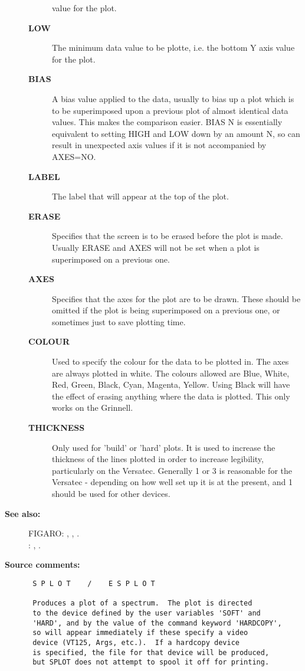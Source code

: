 \begin{description}
\begin{description}
 value for the plot.
\item [{\bf LOW}]
 The minimum data value to be plotte, i.e. the bottom Y axis
 value for the plot.
\item [{\bf BIAS}]
 A bias value applied to the data, usually to bias up a plot
 which is to be superimposed upon a previous plot of almost
 identical data values.  This makes the comparison easier.
 BIAS N  is essentially equivalent to setting HIGH and LOW
 down by an amount N, so can result in unexpected axis values
 if it is not accompanied by AXES=NO.
\item [{\bf LABEL}]
 The label that will appear at the top of the plot.
\item [{\bf ERASE}]
 Specifies that the screen is to be erased before the
 plot is made.  Usually ERASE and AXES will not be set
 when a plot is superimposed on a previous one.
\item [{\bf AXES}]
 Specifies that the axes for the plot are to be drawn.
 These should be omitted if the plot is being superimposed
 on a previous one, or sometimes just to save plotting time.
\item [{\bf COLOUR}]
 Used to specify the colour for the data to be plotted in.
 The axes are always plotted in white.  The colours allowed
 are Blue, White, Red, Green, Black, Cyan, Magenta, Yellow.
 Using Black will have the effect of erasing anything where
 the data is plotted.  This only works on the Grinnell.
\item [{\bf THICKNESS}]
 Only used for 'build' or 'hard' plots.  It is used to
 increase the thickness of the lines plotted in order to
 increase legibility, particularly on the Versatec. Generally
 1 or 3 is reasonable for the Versatec - depending on how well
 set up it is at the present, and 1 should be used for other
 devices.
\end{description}

\item [{\bf See also:}]
FIGARO: , , .\\
: , .\\

\item [{\bf Source comments:}]
\begin{verbatim}
 S P L O T    /    E S P L O T

 Produces a plot of a spectrum.  The plot is directed
 to the device defined by the user variables 'SOFT' and
 'HARD', and by the value of the command keyword 'HARDCOPY',
 so will appear immediately if these specify a video
 device (VT125, Args, etc.).  If a hardcopy device
 is specified, the file for that device will be produced,
 but SPLOT does not attempt to spool it off for printing.


\end{verbatim}
\end{description}
